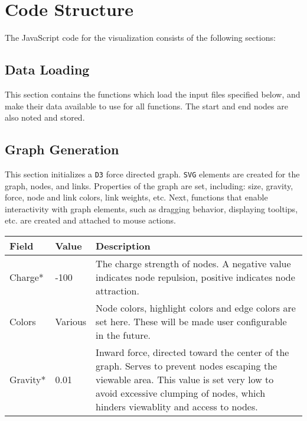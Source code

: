 \documentclass{article}
\begin{document}
	\section{Code Structure} %
		\label{sub:code_structure}
		The JavaScript code for the visualization consists of the following
		sections:

			\subsection{Data Loading}{
			This section contains the functions which load the input files
			specified below, and make their data available to use for all
			functions. The start and end nodes are also noted and stored.
			}
			\subsection{Graph Generation}{
			This section initializes a \texttt{D3} force directed graph.
			\texttt{SVG} elements are created for the graph, nodes, and links.
			Properties of the graph are set, including: size, gravity, force,
			node and link colors, link weights, etc. Next, functions that
			enable interactivity with graph elements, such as dragging
			behavior, displaying tooltips, etc. are created and attached to
			mouse actions.

				\begin{center}\begin{tabular}{|p{1.75cm}|p{1.75cm}|p{10.5cm}|}
					\hline
					\textbf{Field} & \textbf{Value} & \textbf{Description}\\
					\hline

					Charge* 	& -100 & The charge strength of nodes. A
					negative value indicates node repulsion, positive indicates
					node attraction.\\

					\hline

					Colors 		& Various & Node colors, highlight colors and
					edge colors are set here. These will be made user
					configurable in the future.\\

					\hline

					Gravity* 	& 0.01 & Inward force, directed toward the
					center of the graph. Serves to prevent nodes escaping the
					viewable area. This value is set very low to avoid
					excessive clumping of nodes, which hinders viewablity and
					access to nodes. \\


\end{tabular}
\end{center}}
\end{document}
